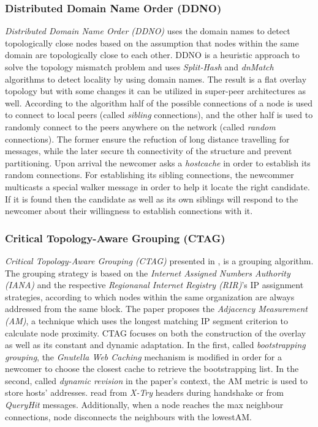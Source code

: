 \subsubsection{Distributed Domain Name Order (DDNO)}
\emph{Distributed Domain Name Order (DDNO)} \cite{z-yk_ddno_2005} uses the
domain names to detect topologically close nodes based on the assumption that
nodes within the same domain are topologically close to each other. DDNO is
a heuristic approach to solve the topology mismatch problem and uses
\emph{Split-Hash} and \emph{dnMatch} algorithms to detect locality by using
domain names. The result is a flat overlay topology but with some changes it
can be utilized in super-peer architectures as well. According to the algorithm
half of the possible connections of a node is used to connect to local peers
(called \emph{sibling} connections), and the other half is used to randomly
connect to the peers anywhere on the network (called \emph{random} connections).
The former ensure the refuction of long distance travelling for messages, while
the later secure th connectivity of the structure and prevent partitioning. Upon
arrival the newcomer asks a \emph{hostcache} in order to establish its random
connections. For establishing its sibling connections, the newcommer multicasts
a special walker message in order to help it locate the right candidate. If it
is found then the candidate as well as its own siblings will respond to the
newcomer about their willingness to establish connections with it.

\subsubsection{Critical Topology-Aware Grouping (CTAG)}
\emph{Critical Topology-Aware Grouping (CTAG)} presented in
\cite{zhao_ctag_2006}, is a grouping algorithm. The grouping strategy is based
on the \emph{Internet Assigned Numbers Authority (IANA)} and the respective
\emph{Regionanal Internet Registry (RIR)}'s IP assignment strategies, according
to which nodes within the same organization are always addressed from the same
block. The paper proposes the \emph{Adjacency Measurement (AM)}, a technique
which uses the longest matching IP segment criterion to calculate node
proximity. CTAG focuses on both the construction of the overlay as well as its
constant and dynamic adaptation. In the first, called \emph{bootstrapping
grouping}, the \emph{Gnutella Web Caching} mechanism is modified in order for a
newcomer to choose the closest cache to retrieve the bootstrapping list. In the
second, called \emph{dynamic revision} in the paper's context, the AM metric is
used to store hosts' addresses. read from \emph{X-Try} headers during handshake
or from \emph{QueryHit} messages. Additionally, when a node reaches the max
neighbour connections, node disconnects the neighbours with the lowestAM.


